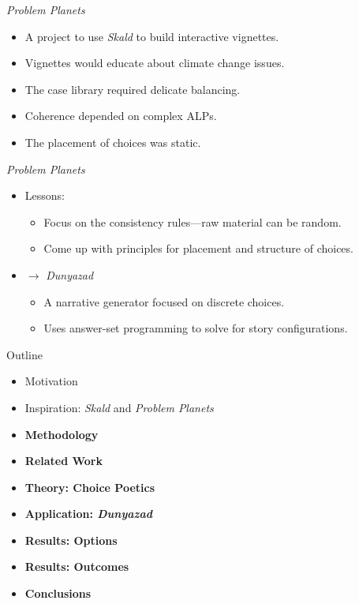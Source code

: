 \documentclass[xcolor=x11names]{beamer}
\def\dunyazad/{\textit{Dunyazad}}
\def\skald/{\textit{Skald}}
\def\problemplanets/{\textit{Problem Planets}}
\begin{document}
\begin{frame}{\problemplanets/}
  \begin{itemize}\addtolength{\itemsep}{0.5\baselineskip}
    \item A project to use \skald/ to build interactive vignettes.
    \item Vignettes would educate about climate change issues.
    \item The case library required delicate balancing.
    \item Coherence depended on complex ALPs.
    \item The placement of choices was static.
  \end{itemize}
\end{frame}

\begin{frame}{\problemplanets/}
  \begin{itemize}\addtolength{\itemsep}{0.5\baselineskip}
    \item Lessons:
    \begin{itemize}\addtolength{\itemsep}{0.5\baselineskip}
      \vspace{0.5\baselineskip}
      \item Focus on the consistency rules---raw material can be random.
      \item Come up with principles for placement and structure of choices.
    \end{itemize}
    \item $\rightarrow$ \dunyazad/
    \begin{itemize}\addtolength{\itemsep}{0.5\baselineskip}
      \vspace{0.5\baselineskip}
      \item A narrative generator focused on discrete choices.
      \item Uses answer-set programming to solve for story configurations.
    \end{itemize}
  \end{itemize}
\end{frame}

\begin{frame}{Outline}
  \begin{itemize}
    \item Motivation
    \item Inspiration: \skald/ and \problemplanets/
    \item \textbf{Methodology}
    \item \textbf{Related Work}
    \item \textbf{Theory: Choice Poetics}
    \item \textbf{Application: \dunyazad/}
    \item \textbf{Results: Options}
    \item \textbf{Results: Outcomes}
    \item \textbf{Conclusions}
  \end{itemize}
\end{frame}
\end{document}
